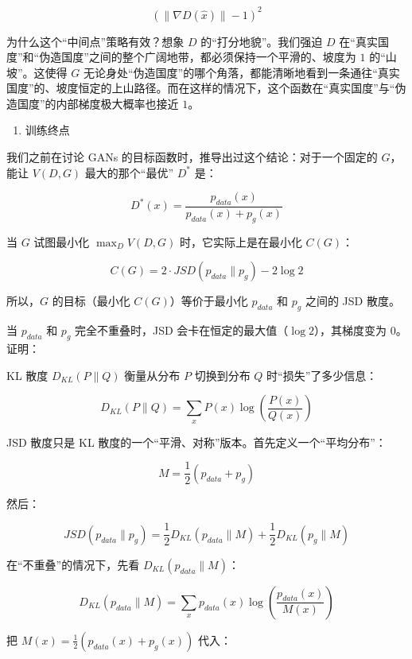 \[
(\lVert \nabla D(\hat{x}) \rVert - 1)^2
\]

为什么这个``中间点''策略有效？想象 \(D\) 的``打分地貌''。我们强迫 \(D\) 在``真实国度''和``伪造国度''之间的整个广阔地带，都必须保持一个平滑的、坡度为 \(1\) 的``山坡''。这使得 \(G\) 无论身处``伪造国度''的哪个角落，都能清晰地看到一条通往``真实国度''的、坡度恒定的上山路径。而在这样的情况下，这个函数在``真实国度''与``伪造国度''的内部梯度极大概率也接近 \(1\)。

\begin{enumerate}
\def\labelenumi{\arabic{enumi}.}
\setcounter{enumi}{2}
\tightlist
\item
  训练终点
\end{enumerate}

我们之前在讨论 GANs 的目标函数时，推导出过这个结论：对于一个固定的 \(G\)，能让 \(V(D,G)\) 最大的那个``最优'' \(D^*\) 是：

\[
D^*(x)=\frac{p_{data}(x)}{p_{data}(x)+p_g(x)}
\]

当 \(G\) 试图最小化 \(\max_D V(D,G)\) 时，它实际上是在最小化 \(C(G)\)：

\[
C(G)=2\cdot JSD(p_{data}\parallel p_g)-2\log 2
\]

所以，\(G\) 的目标（最小化 \(C(G)\)）等价于最小化 \(p_{data}\) 和 \(p_g\) 之间的 JSD 散度。

当 \(p_{data}\) 和 \(p_g\) 完全不重叠时，JSD 会卡在恒定的最大值（\(\log 2\)），其梯度变为 \(0\)。证明：

KL 散度 \(D_{KL}(P\parallel Q)\) 衡量从分布 \(P\) 切换到分布 \(Q\) 时``损失''了多少信息：

\[
D_{KL}(P\parallel Q)=\sum_x P(x)\log\left(\frac{P(x)}{Q(x)}\right)
\]

JSD 散度只是 KL 散度的一个``平滑、对称''版本。首先定义一个``平均分布''：

\[
M=\frac{1}{2}(p_{data}+p_g)
\]

然后：

\[
JSD(p_{data}\parallel p_g)=\frac{1}{2}D_{KL}(p_{data}\parallel M)+\frac{1}{2}D_{KL}(p_g\parallel M)
\]

在``不重叠''的情况下，先看 \(D_{KL}(p_{data}\parallel M)\)：

\[
D_{KL}(p_{data}\parallel M)=\sum_x p_{data}(x)\log\left(\frac{p_{data}(x)}{M(x)}\right)
\]

把 \(M(x)=\frac{1}{2}(p_{data}(x)+p_g(x))\) 代入：

